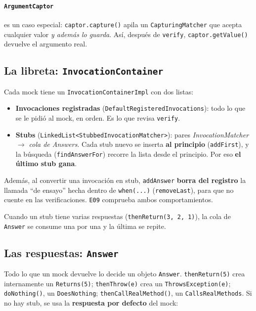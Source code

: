 \documentclass[11pt,a4paper,oneside]{report}
\newcommand{\code}[1]{\texttt{#1}}
\begin{document}
\paragraph{\code{ArgumentCaptor}} es un caso especial: \code{captor.capture()} apila un \code{CapturingMatcher} que acepta cualquier valor \emph{y además lo guarda}. Así, después de \code{verify}, \code{captor.getValue()} devuelve el argumento real.

\subsection{La libreta: \code{InvocationContainer}}
Cada mock tiene un \code{InvocationContainerImpl} con dos listas:
\begin{itemize}
  \item \textbf{Invocaciones registradas} (\code{DefaultRegisteredInvocations}): todo lo que se le pidió al mock, en orden. Es lo que revisa \code{verify}.
  \item \textbf{Stubs} (\code{LinkedList<StubbedInvocationMatcher>}): pares \emph{InvocationMatcher $\rightarrow$ cola de Answers}. Cada stub nuevo se inserta \textbf{al principio} (\code{addFirst}), y la búsqueda (\code{findAnswerFor}) recorre la lista desde el principio. Por eso \textbf{el último stub gana}.
\end{itemize}
Además, al convertir una invocación en stub, \code{addAnswer} \textbf{borra del registro} la llamada ``de ensayo'' hecha dentro de \code{when(...)} (\code{removeLast}), para que no cuente en las verificaciones. \code{E09} comprueba ambos comportamientos.

Cuando un stub tiene varias respuestas (\code{thenReturn(3, 2, 1)}), la cola de \code{Answer} se consume una por una y la última se repite.

\subsection{Las respuestas: \code{Answer}}
Todo lo que un mock devuelve lo decide un objeto \code{Answer}. \code{thenReturn(5)} crea internamente un \code{Returns(5)}; \code{thenThrow(e)} crea un \code{ThrowsException(e)}; \code{doNothing()}, un \code{DoesNothing}; \code{thenCallRealMethod()}, un \code{CallsRealMethods}. Si no hay stub, se usa la \textbf{respuesta por defecto} del mock:
\end{document}
